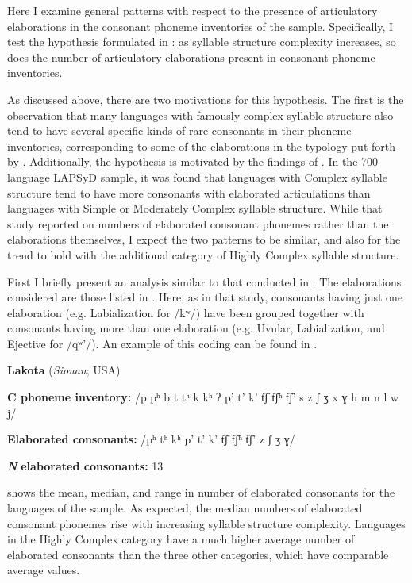   Here I examine general patterns with respect to the presence of articulatory elaborations in the consonant phoneme inventories of the sample. Specifically, I test the hypothesis formulated in : as syllable structure complexity increases, so does the number of articulatory elaborations present in consonant phoneme inventories.

  As discussed above, there are two motivations for this hypothesis. The first is the observation that many languages with famously complex syllable structure also tend to have several specific kinds of rare consonants in their phoneme inventories, corresponding to some of the elaborations in the typology put forth by \citet{LindblomMaddieson1988}. Additionally, the hypothesis is motivated by the findings of \citet{MaddiesonEtAl2013}. In the 700-language LAPSyD sample, it was found that languages with Complex syllable structure tend to have more consonants with elaborated articulations than languages with Simple or Moderately Complex syllable structure. While that study reported on numbers of elaborated consonant phonemes rather than the elaborations themselves, I expect the two patterns to be similar, and also for the trend to hold with the additional category of Highly Complex syllable structure.

  First I briefly present an analysis similar to that conducted in \citet{MaddiesonEtAl2013}. The elaborations considered are those listed in . Here, as in that study, consonants having just one elaboration (e.g. Labialization for /kʷ/) have been grouped together with consonants having more than one elaboration (e.g. Uvular, Labialization, and Ejective for /qʷ’/). An example of this coding can be found in .

\ea\label{ex:4.26}
  \textbf{Lakota} (\textit{Siouan}; USA)

\textbf{C phoneme inventory:} /p pʰ b t tʰ k kʰ ʔ p’ t’ k’ t͡ʃ t͡ʃʰ t͡ʃ’ s z ʃ ʒ x ɣ h m n l w j/

\textbf{Elaborated consonants:} /pʰ tʰ kʰ p’ t’ k’ t͡ʃ t͡ʃʰ t͡ʃ’ z ʃ ʒ ɣ/

\textbf{\textit{N}} \textbf{elaborated consonants:} 13
\z

   shows the mean, median, and range in number of elaborated consonants for the languages of the sample. As expected, the median numbers of elaborated consonant phonemes rise with increasing syllable structure complexity. Languages in the Highly Complex category have a much higher average number of elaborated consonants than the three other categories, which have comparable average values.

